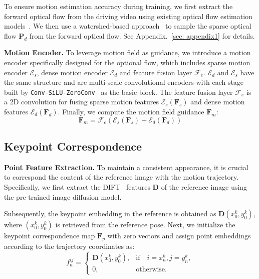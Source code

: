 To ensure motion estimation accuracy during training, we first extract the forward optical flow from the driving video using existing optical flow estimation models~\citep{teed2020raft, xu2023unifying}. We then use a watershed-based approach~\citep{zhan2019self} to sample the sparse optical flow $\mathbf{P}_{d}$ from the forward optical flow. See Appendix.~\ref{sec: appendix1} for details.

\textbf{Motion Encoder.} To leverage motion field as guidance, we introduce a motion encoder specifically designed for the optional flow, which includes sparse motion encoder $\mathcal{E}_s$, dense motion encoder $\mathcal{E}_d$ and feature fusion layer $\mathcal{F}_e$. $\mathcal{E}_d$ and $\mathcal{E}_s$ have the same structure and are multi-scale convolutional encoders with each stage built by \texttt{Conv-SiLU-ZeroConv}~\citep{zhang2023adding} as the basic block. The feature fusion layer $\mathcal{F}_e$ is a 2D convolution for fusing sparse motion features $\mathcal{E}_s(\mathbf{F}_s)$ and dense motion features $\mathcal{E}_d(\mathbf{F}_d)$. Finally, we compute the motion field guidance $\mathbf{F}_m$:
\begin{equation}
    \mathbf{F}_m = \mathcal{F}_e(\mathcal{E}_s(\mathbf{F}_s)+\mathcal{E}_d(\mathbf{F}_d))
\end{equation}

\subsection{Keypoint Correspondence}
\label{sec: keypoint}
\textbf{Point Feature Extraction.} 
To maintain a consistent appearance, it is crucial to correspond the content of the reference image with the motion trajectory. 
Specifically, we first extract the DIFT~\citep{tang2023emergent} features $\mathbf{D}$ of the reference image using the pre-trained image diffusion model. 

Subsequently, the keypoint embedding in the reference is obtained as $\mathbf{D}(x^k_0,y^k_0)$, where $(x^k_0,y^k_0)$ is retrieved from the reference pose.
Next, we initialize the keypoint correspondence map $\mathbf{F}_p$ with zero vectors and assign point embeddings according to the trajectory coordinates as:
\begin{equation}
\label{eq: v prob}
f^{ij}_n=\left\{\begin{array}{ll}
\mathbf{D}(x^k_0,y^k_0), & \mathrm{if} \quad i=x^k_n, j=y^k_n,  \\
0, & \mathrm{otherwise}.
\end{array}\right.
\end{equation}

